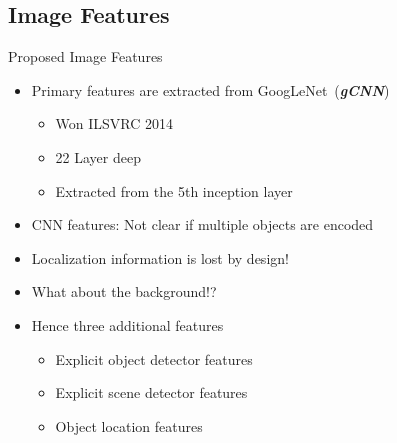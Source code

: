 \documentclass{beamer}
\begin{document}
\subsection{Image Features}
\begin{frame}{Proposed Image Features}
    \begin{itemize}
            \item Primary features are extracted from GoogLeNet~(\textbf{\emph{gCNN}})
        \begin{itemize}
            \item Won ILSVRC 2014 
            \item 22 Layer deep
            \item Extracted from the 5th inception layer 
        \end{itemize}
        \item CNN features: Not clear if multiple objects are encoded 
        \item Localization information is lost by design! 
        \item What about the background!? 
        \item Hence three additional features 
           \begin{itemize}
               \item Explicit object detector features
               \item Explicit scene detector features 
               \item Object location features 
           \end{itemize}
    \end{itemize}
\end{frame}
\end{document}
